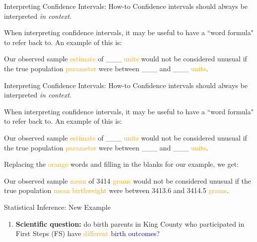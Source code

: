 \documentclass[10pt,t]{beamer}
\begin{document}
\begin{frame}{Interpreting Confidence Intervals: How-to}
Confidence intervals should always be interpreted \textit{in context}.

\vspace{0.3cm}

When interpreting confidence intervals, it may be useful to have a ``word formula" to refer back to. An example of this is:

\vspace{0.3cm}

Our observed sample \textcolor{orange}{estimate} of \_\_\_ \textcolor{orange}{units} would not be considered unusual if the true population \textcolor{orange}{parameter} were between \_\_\_ and \_\_\_ \textcolor{orange}{units}.

\end{frame}

\begin{frame}{Interpreting Confidence Intervals: How-to}
Confidence intervals should always be interpreted \textit{in context}.

\vspace{0.3cm}

When interpreting confidence intervals, it may be useful to have a ``word formula" to refer back to. An example of this is:

\vspace{0.3cm}

Our observed sample \textcolor{orange}{estimate} of \_\_\_ \textcolor{orange}{units} would not be considered unusual if the true population \textcolor{orange}{parameter} were between \_\_\_ and \_\_\_ \textcolor{orange}{units}.

\vspace{0.3cm}

Replacing the \textcolor{orange}{orange} words and filling in the blanks for our example, we get:

\vspace{0.3cm}

Our observed sample \textcolor{orange}{mean} of 3414 \textcolor{orange}{grams} would not be considered unusual if the true population \textcolor{orange}{mean birthweight} were between 3413.6 and 3414.5 \textcolor{orange}{grams}.

\end{frame}

\begin{frame}{Statistical Inference: New Example}

\begin{enumerate}
	\item \textbf{Scientific question:} do birth parents in King County who participated in First Steps (FS) have \textcolor{orange}{different} \textcolor{blue}{birth outcomes}?
\end{enumerate}

\end{frame}
\end{document}

